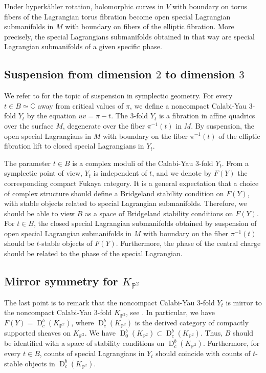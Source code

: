 \documentclass[11pt,letterpaper]{amsart}
\newcommand\C{\mathbb C}
\newcommand\PP{\mathbb P}
\newcommand\D{\operatorname{D}}
\begin{document}
Under hyperkähler rotation, holomorphic curves in $V$
with boundary on torus fibers of the Lagrangian torus fibration become open special Lagrangian submanifolds 
in $M$ with boundary on fibers of the elliptic fibration. More precisely, the special Lagrangians submanifolds obtained in that way are special Lagrangian submanifolds of a given specific phase.


\subsection{Suspension from dimension $2$ to dimension $3$}

We refer to \cite{MR2651908} for the topic of suspension in symplectic geometry.
For every $t \in B \simeq \C$
away from critical values of $\pi$, we define a 
noncompact Calabi-Yau 3-fold 
$Y_t$ by the equation $uv=\pi-t$.
The 3-fold $Y_t$ is 
a fibration in affine quadrics over the surface 
$M$, degenerate over the fiber $\pi^{-1}(t)$
in $M$.
By suspension, the open special Lagrangians
in $M$ with boundary on the fiber 
$\pi^{-1}(t)$ of the elliptic fibration
lift to closed special Lagrangians in $Y_t$.

The parameter $t \in B$ is a complex moduli of the Calabi-Yau 3-fold $Y_t$. From a symplectic point of view, $Y_t$ is independent of $t$, and we denote by $F(Y)$ the corresponding compact Fukaya category.
It is a general expectation
\cite{MR1882337, MR1957663, MR3354954} that a choice of
complex structure should define a Bridgeland stability condition on $F(Y)$, with stable objects related to special Lagrangian submanifolds. Therefore, we should be able to view $B$ as a space of Bridgeland stability conditions on $F(Y)$. For $t \in B$, 
the closed special Lagrangian submanifolds obtained by suspension of open special Lagrangian submanifolds in $M$
with boundary on the fiber $\pi^{-1}(t)$
should be $t$-stable objects of $F(Y)$.
Furthermore, the phase of the central charge should be related to the phase of the special Lagrangian.

\subsection{Mirror symmetry for $K_{\PP^2}$}
The last point is to remark that the noncompact Calabi-Yau 3-fold $Y_t$ is mirror to the noncompact Calabi-Yau 3-fold $K_{\PP^2}$, see \cite{MR2651908} \cite{chan2016lagrangian}.
In particular, we have $F(Y)=\D^b_c(K_{\PP^2})$, where $\D^b_c(K_{\PP^2})$ is the derived category of compactly supported sheaves on $K_{\PP^2}$. We have 
$\D^b_0(K_{\PP^2}) \subset \D^b_c(K_{\PP^2})$. Thus, $B$ should be identified with a space of stability conditions on $\D^b_c(K_{\PP^2})$.
Furthermore, for every $t \in B$, counts of special Lagrangians in 
$Y_t$ should coincide with counts of $t$-stable objects in $\D^b_c(K_{\PP^2})$.
\end{document}

